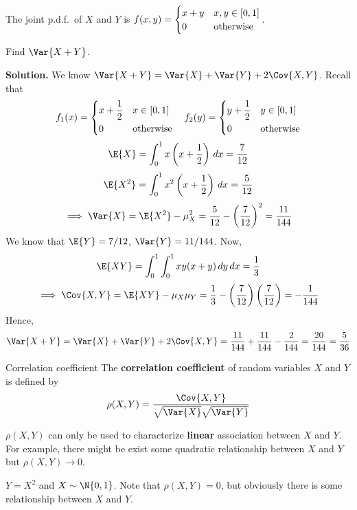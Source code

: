 \begin{Example}{}{}
    The joint p.d.f.\ of $ X $ and $ Y $ is
    $ f(x,y)=\begin{cases}
            x+y & x,y\in\interval{0}{1} \\
            0   & \text{otherwise}
        \end{cases} $.

    Find $ \Var{X+Y} $.

    \textbf{Solution.} We know $ \Var{X+Y}=\Var{X}+\Var{Y}+2\Cov{X,Y} $. Recall
    that
    \[ f_1(x)=\begin{dcases}
            x+\frac{1}{2} & x\in\interval{0}{1} \\
            0             & \text{otherwise}
        \end{dcases}\quad
        f_2(y)=\begin{dcases}
            y+\frac{1}{2} & y\in\interval{0}{1} \\
            0             & \text{otherwise}
        \end{dcases} \]
    \[ \E{X}=\int_{0}^{1} x\left( x+\frac{1}{2}  \right)\, d{x} =
        \frac{7}{12} \]
    \[ \E{X^2}=\int_{0}^{1} x^2\left( x+\frac{1}{2}  \right)\, d{x}=
        \frac{5}{12} \]
    \[ \implies\Var{X}=\E{X^2}-\mu_X^2=\frac{5}{12}-\left( \frac{7}{12} \right)^2=\frac{11}{144}  \]
    We know that $ \E{Y}=7/12 $, $ \Var{Y}=11/144 $. Now,
    \[ \E{XY}=
        \int_{0}^{1} \int_{0}^{1} x y(x+y)\, d{y}\, d{x}=\frac{1}{3}  \]
    \[ \implies \Cov{X,Y}=\E{XY}-\mu_X\mu_Y=
        \frac{1}{3} -\left( \frac{7}{12}  \right)\left( \frac{7}{12}  \right)=
        -\frac{1}{144}  \]
    Hence,
    \[ \Var{X+Y}=\Var{X}+\Var{Y}+2\Cov{X,Y}=
        \frac{11}{144} +\frac{11}{144} -\frac{2}{144} =\frac{20}{144}=\frac{5}{36} \]
\end{Example}
\begin{Definition}{Correlation coefficient}{}
    The \textbf{correlation coefficient} of
    random variables $ X $ and $ Y $ is defined by
    \[ \rho(X,Y)=\frac{\Cov{X,Y}}{\sqrt{\Var{X}}\sqrt{\Var{Y}}}  \]
\end{Definition}
\begin{Remark}{}{}
    $ \rho(X,Y) $ can only be used to characterize \textbf{linear} association
    between $ X $ and $ Y $. For example, there might be exist some quadratic
    relationship between $ X $ and $ Y $ but $ \rho(X,Y)\to 0 $.
\end{Remark}
\begin{Example}{}{}
    $ Y=X^2 $ and $ X \sim \N{0,1} $. Note that $ \rho(X,Y)=0 $,
    but obviously there is some relationship between $ X $ and $ Y $.
\end{Example}
